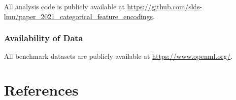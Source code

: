 \documentclass[smallextended]{svjour3}       %
\begin{document}
All analysis code is publicly available at \url{https://github.com/slds-lmu/paper_2021_categorical_feature_encodings}.

\hypertarget{availability-of-data}{%
\subsubsection{Availability of Data}\label{availability-of-data}}

All benchmark datasets are publicly available at \url{https://www.openml.org/}.

\hypertarget{references}{%
\section*{References}\label{references}}

\raggedright
\end{document}
